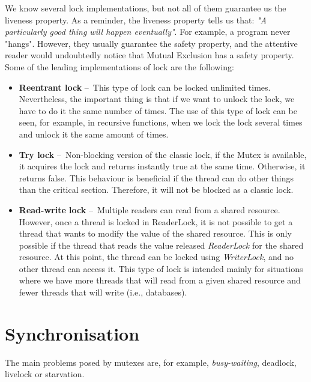 We know several lock implementations, but not all of them guarantee us the liveness property.
As a reminder, the liveness property tells us that: \emph{"A particularly good thing will happen eventually"}.
For example, a program never "hangs".
However, they usually guarantee the safety property, and the attentive reader would undoubtedly notice that Mutual Exclusion has a safety property.
Some of the leading implementations of lock are the following:
\begin {itemize}
    \item \textbf{Reentrant lock} \---\ This type of lock can be locked unlimited times.
    Nevertheless, the important thing is that if we want to unlock the lock, we have to do it the same number of times.
    The use of this type of lock can be seen, for example, in recursive functions, when we lock the lock several times and unlock it the same amount of times.
    \item \textbf{Try lock} \---\ Non-blocking version of the classic lock, if the Mutex is available, it acquires the lock and returns instantly true at the same time.
    Otherwise, it returns false.
    This behaviour is beneficial if the thread can do other things than the critical section.
    Therefore, it will not be blocked as a classic lock.
    \item \textbf{Read-write lock} \---\ Multiple readers can read from a shared resource.
    However, once a thread is locked in ReaderLock, it is not possible to get a thread that wants to modify the value of the shared resource.
    This is only possible if the thread that reads the value released \emph{ReaderLock} for the shared resource.
    At this point, the thread can be locked using \emph{WriterLock}, and no other thread can access it.
    This type of lock is intended mainly for situations where we have more threads that will read from a given shared resource and fewer threads that will write (i.e., databases).
\end{itemize}

\section{Synchronisation}
\label{04:synchronization}

The main problems posed by mutexes are, for example, \emph {busy-waiting}, deadlock, livelock or starvation.

